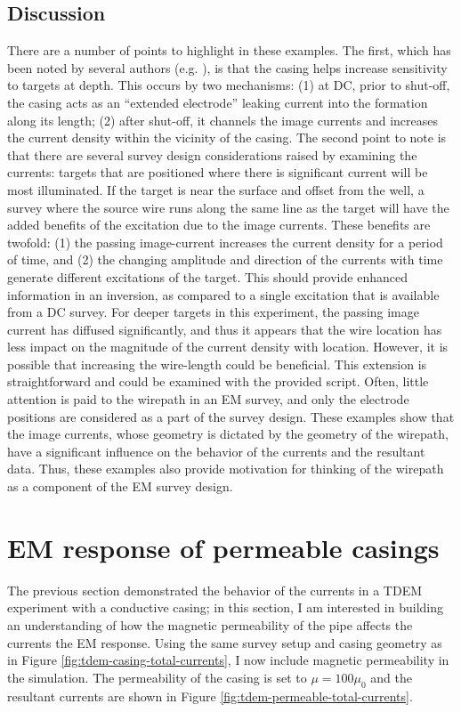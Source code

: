 \subsection{Discussion}
There are a number of points to highlight in these examples. The first, which has been noted by several authors (e.g. \cite{Schenkel1994, Hoversten2015}), is that the casing helps increase sensitivity to targets at depth. This occurs by two mechanisms: (1) at DC, prior to shut-off, the casing acts as an ``extended electrode'' leaking current into the formation along its length; (2) after shut-off, it channels the image currents and increases the current density within the vicinity of the casing. The second point to note is that there are several survey design considerations raised by examining the currents: targets that are positioned where there is significant current will be most illuminated. If the target is near the surface and offset from the well, a survey where the source wire runs along the same line as the target will have the added benefits of the excitation due to the image currents. These benefits are twofold: (1) the passing image-current increases the current density for a period of time, and (2) the changing amplitude and direction of the currents with time generate different excitations of the target. This should provide enhanced information in an inversion, as compared to a single excitation that is available from a DC survey. For deeper targets in this experiment, the passing image current has diffused significantly, and thus it appears that the wire location has less impact on the magnitude of the current density with location. However, it is possible that increasing the wire-length could be beneficial. This extension is straightforward and could be examined with the provided script. Often, little attention is paid to the wirepath in an EM survey, and only the electrode positions are considered as a part of the survey design. These examples show that the image currents, whose geometry is dictated by the geometry of the wirepath, have a significant influence on the behavior of the currents and the resultant data. Thus, these examples also provide motivation for thinking of the wirepath as a component of the EM survey design.


\section{EM response of permeable casings}
\label{sec:permeable-casing}

The previous section demonstrated the behavior of the currents in a TDEM experiment with a conductive casing; in this section, I am interested in building an understanding of how the magnetic permeability of the pipe affects the currents the EM response. Using the same survey setup and casing geometry as in Figure \ref{fig:tdem-casing-total-currents}, I now include magnetic permeability in the simulation. The  permeability of the casing is set to $\mu = 100\mu_0$ and the resultant currents are shown in Figure \ref{fig:tdem-permeable-total-currents}.


